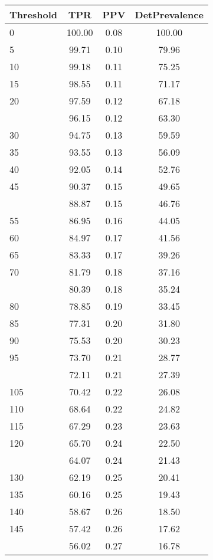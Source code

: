\begin{table}[ht]
\centering
\begin{tabular}{lccc}
  \toprule
Threshold & TPR & PPV & DetPrevalence \\ 
  \midrule
0 & 100.00 & 0.08 & 100.00 \\ 
  5 & 99.71 & 0.10 & 79.96 \\ 
  10 & 99.18 & 0.11 & 75.25 \\ 
  15 & 98.55 & 0.11 & 71.17 \\ 
  20 & 97.59 & 0.12 & 67.18 \\ 
   \addlinespace
25 & 96.15 & 0.12 & 63.30 \\ 
  30 & 94.75 & 0.13 & 59.59 \\ 
  35 & 93.55 & 0.13 & 56.09 \\ 
  40 & 92.05 & 0.14 & 52.76 \\ 
  45 & 90.37 & 0.15 & 49.65 \\ 
   \addlinespace
50 & 88.87 & 0.15 & 46.76 \\ 
  55 & 86.95 & 0.16 & 44.05 \\ 
  60 & 84.97 & 0.17 & 41.56 \\ 
  65 & 83.33 & 0.17 & 39.26 \\ 
  70 & 81.79 & 0.18 & 37.16 \\ 
   \addlinespace
75 & 80.39 & 0.18 & 35.24 \\ 
  80 & 78.85 & 0.19 & 33.45 \\ 
  85 & 77.31 & 0.20 & 31.80 \\ 
  90 & 75.53 & 0.20 & 30.23 \\ 
  95 & 73.70 & 0.21 & 28.77 \\ 
   \addlinespace
100 & 72.11 & 0.21 & 27.39 \\ 
  105 & 70.42 & 0.22 & 26.08 \\ 
  110 & 68.64 & 0.22 & 24.82 \\ 
  115 & 67.29 & 0.23 & 23.63 \\ 
  120 & 65.70 & 0.24 & 22.50 \\ 
   \addlinespace
125 & 64.07 & 0.24 & 21.43 \\ 
  130 & 62.19 & 0.25 & 20.41 \\ 
  135 & 60.16 & 0.25 & 19.43 \\ 
  140 & 58.67 & 0.26 & 18.50 \\ 
  145 & 57.42 & 0.26 & 17.62 \\ 
   \addlinespace
150 & 56.02 & 0.27 & 16.78 \\ 

\end{tabular}
\end{table}
